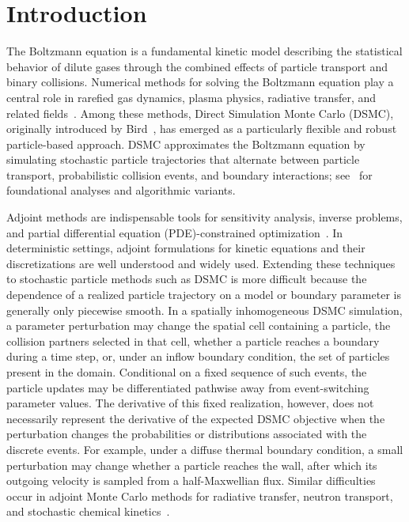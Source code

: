 \documentclass[12pt,nopreprintline]{elsarticle}
\begin{document}
\section{Introduction}
\label{sec:Intro}

The Boltzmann equation is a fundamental kinetic model describing the statistical behavior of dilute gases through the combined effects of particle transport and binary collisions. Numerical methods for solving the Boltzmann equation play a central role in rarefied gas dynamics, plasma physics, radiative transfer, and related fields~\cite{cercignani1988boltzmann,cercignani2000rarefied}. Among these methods, Direct Simulation Monte Carlo (DSMC), originally introduced by Bird~\cite{bird1970direct,bird1994molecular}, has emerged as a particularly flexible and robust particle-based approach. DSMC approximates the Boltzmann equation by simulating stochastic particle trajectories that alternate between particle transport, probabilistic collision events, and boundary interactions; see~\cite{nanbu1980direct,babovsky1986simulation,pareschi2001introduction} for foundational analyses and algorithmic variants.

Adjoint methods are indispensable tools for sensitivity analysis, inverse problems, and partial differential equation (PDE)-constrained optimization~\cite{biegler2003large,hinze2008optimization}. In deterministic settings, adjoint formulations for kinetic equations and their discretizations are well understood and widely used. Extending these techniques to stochastic particle methods such as DSMC is more difficult because the dependence of a realized particle trajectory on a model or boundary parameter is generally only piecewise smooth. In a spatially inhomogeneous DSMC simulation, a parameter perturbation may change the spatial cell containing a particle, the collision partners selected in that cell, whether a particle reaches a boundary during a time step, or, under an inflow boundary condition, the set of particles present in the domain. Conditional on a fixed sequence of such events, the particle updates may be differentiated pathwise away from event-switching parameter values. The derivative of this fixed realization, however, does not necessarily represent the derivative of the expected DSMC objective when the perturbation changes the probabilities or distributions associated with the discrete events. For example, under a diffuse thermal boundary condition, a small perturbation may change whether a particle reaches the wall, after which its outgoing velocity is sampled from a half-Maxwellian flux. Similar difficulties occur in adjoint Monte Carlo methods for radiative transfer, neutron transport, and stochastic chemical kinetics~\cite{hoogenboom1977adjoint,bal2011importance,wang2016efficiency}.
\end{document}
